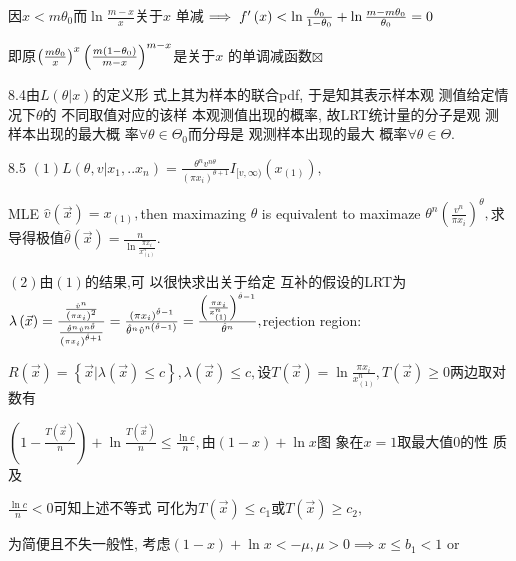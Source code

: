 \documentclass{article}
\begin{document}
因$x<m\theta _{0}$而$\ln \frac{m-x}{x}$关于$x$%
单减$\implies f^{\prime }\left( x\right) <\ln \frac{\theta _{0}}{%
1-\theta _{0}}+\ln \frac{m-m\theta _{0}}{\theta _{0}}=0$

即原$\left( \frac{m\theta _{0}}{x}\right) ^{x}\left( \frac{%
m\left( 1-\theta _{0}\right) }{m-x}\right) ^{m-x}$是关于$x$%
的单调减函数$\boxtimes $

8.4由$L\left( \theta |x\right) $的定义形%
式上其为样本的联合pdf,%
于是知其表示样本观%
测值给定情况下$\theta $的%
不同取值对应的该样%
本观测值出现的概率,%
故LRT统计量的分子是观%
测样本出现的最大概%
率$\forall \theta \in \Theta _{0}$而分母是%
观测样本出现的最大%
概率$\forall \theta \in \Theta .$

8.5 $\left( 1\right) L\left( \theta ,v|x_{1},..x_{n}\right) =\frac{\theta
^{n}v^{n\theta }}{\left( \pi x_{i}\right) ^{\theta +1}}I_{[v,\infty )}\left(
x_{\left( 1\right) }\right) ,$

MLE $\hat{v}\left( \vec{x}\right) =x_{\left( 1\right) },$then maximazing $%
\theta $ is equivalent to maximaze $\theta ^{n}\left( \frac{v^{n}}{\pi x_{i}}%
\right) ^{\theta },$求导得极值$\hat{\theta}%
\left( \vec{x}\right) =\frac{n}{\ln \frac{\pi x_{i}}{x_{\left( 1\right) }^{n}%
}}.$

$\left( 2\right) $由$\left( 1\right) $的结果,可%
以很快求出关于给定%
互补的假设的LRT为$\lambda \left( 
\vec{x}\right) =\frac{\frac{\hat{v}^{n}}{\left( \pi x_{i}\right) ^{2}}}{%
\frac{\hat{\theta}^{n}\hat{v}^{n\hat{\theta}}}{\left( \pi x_{i}\right) ^{%
\hat{\theta}+1}}}=\frac{\left( \pi x_{i}\right) ^{\hat{\theta}-1}}{\hat{%
\theta}^{n}\hat{v}^{n\left( \hat{\theta}-1\right) }}=\frac{\left( \frac{\pi
x_{i}}{x_{\left( 1\right) }^{n}}\right) ^{\hat{\theta}-1}}{\hat{\theta}^{n}}%
, $rejection region:

$R\left( \vec{x}\right) =\left\{ \vec{x}|\lambda \left( \vec{x}\right) \leq
c\right\} ,\lambda \left( \vec{x}\right) \leq c,$设$T\left( \vec{x}%
\right) =\ln \frac{\pi x_{i}}{x_{\left( 1\right) }^{n}},T\left( \vec{x}%
\right) \geq 0$两边取对数有\qquad

$\left( 1-\frac{T\left( \vec{x}\right) }{n}\right) +\ln \frac{T\left( \vec{x}%
\right) }{n}\leq \frac{\ln c}{n},$由$\left( 1-x\right) +\ln x$图%
象在$x=1$取最大值0的性%
质及

$\frac{\ln c}{n}<0$可知上述不等式%
可化为$T\left( \vec{x}\right) \leq c_{1}$或$T\left( 
\vec{x}\right) \geq c_{2},$

为简便且不失一般性,%
考虑$\left( 1-x\right) +\ln x<-\mu ,\mu >0\implies x\leq b_{1}<1$
or
\end{document}
